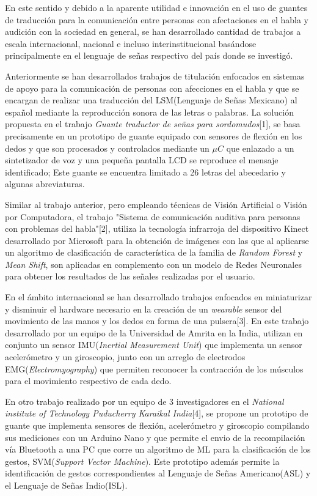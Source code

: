 \hfill \break
\justifying
En este sentido y debido a la aparente utilidad e innovación en el uso de guantes de traducción para la comunicación entre personas con afectaciones en el habla y audición con la sociedad en general, se han desarrollado cantidad de trabajos a escala internacional, nacional e incluso interinstitucional basándose principalmente en el lenguaje de señas respectivo del país donde se investigó.

%
%
\hfill \break
\justifying
Anteriormente se han desarrollados trabajos de titulación enfocados en sistemas de apoyo para la comunicación de personas con afecciones en el habla y que se encargan de realizar una traducción del LSM(Lenguaje de Señas Mexicano) al español mediante la reproducción sonora de las letras o palabras. La solución propuesta en el trabajo \textit{Guante traductor de señas para sordomudos}[1], se basa precisamente en un prototipo de guante equipado con sensores de flexión en los dedos y que son procesados y controlados mediante un $\mu C$ que enlazado a un sintetizador de voz y una pequeña pantalla LCD se reproduce el mensaje identificado; Este guante se encuentra limitado a 26 letras del abecedario y algunas abreviaturas.

\hfill \break
\justifying
Similar al trabajo anterior, pero empleando técnicas de Visión Artificial o Visión por Computadora, el trabajo "Sistema de comunicación auditiva para personas con problemas del habla"[2], utiliza la tecnología infrarroja del dispositivo Kinect desarrollado por Microsoft para la obtención de imágenes con las que al aplicarse un algoritmo de clasificación de característica de la familia de \textit{Random Forest} y \textit{Mean Shift}, son aplicadas en complemento con un modelo de Redes Neuronales para obtener los resultados de las señales realizadas por el usuario.

\hfill \break
\justifying
En el ámbito internacional se han desarrollado trabajos enfocados en miniaturizar y disminuir el hardware necesario en la creación de un \textit{wearable} sensor del movimiento de las manos y los dedos en forma de una pulsera[3]. En este trabajo desarrollado por un equipo de la Universidad de Amrita en la India, utilizan en conjunto un sensor IMU(\textit{Inertial Measurement Unit}) que implementa un sensor acelerómetro y un giroscopio, junto con un arreglo de electrodos EMG(\textit{Electromyography}) que permiten reconocer la contracción de los músculos para el movimiento respectivo de cada dedo.

\hfill \break
\justifying
En otro trabajo realizado por un equipo de 3 investigadores en el \textit{National institute of Technology Puducherry Karaikal India}[4], se propone un prototipo de guante que implementa sensores de flexión, acelerómetro y giroscopio compilando sus mediciones con un Arduino Nano y que permite el envio de la recompilación vía Bluetooth a una PC que corre un algoritmo de ML para la clasificación de los gestos, SVM(\textit{Support Vector Machine}). Este prototipo además permite la identificación de gestos correspondientes al Lenguaje de Señas Americano(ASL) y el Lenguaje de Señas Indio(ISL).

